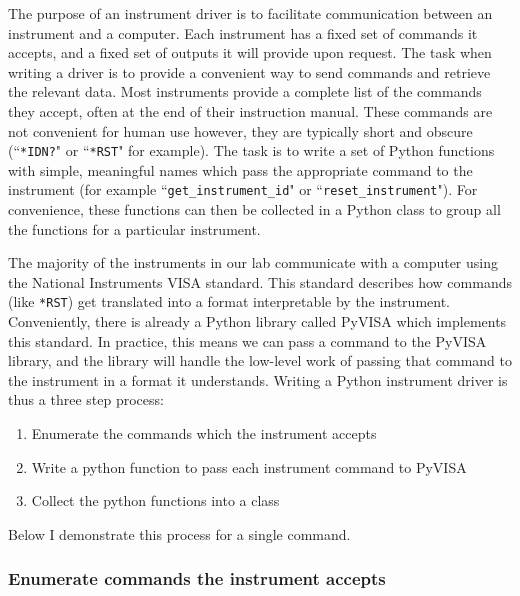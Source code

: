 \documentclass[edeposit,fullpage,draftthesis]{uiucthesis2009}
\newcommand{\code}[1]{\texttt{#1}}
\begin{document}
\begin{appendices}
    The purpose of an instrument driver is to facilitate communication between an instrument and a
    computer. Each instrument has a fixed set of commands it accepts, and a fixed set of outputs it will
    provide upon request. The task when writing a driver is to provide a convenient way to send commands
    and retrieve the relevant data.
    Most instruments provide a complete list of the commands they accept, often at the end of their instruction manual.
    These commands are not convenient for human use however, they are typically short and obscure 
    (``\code{*IDN?}" or ``\code{*RST}" for example).
    The task is to write a set of Python functions with simple, meaningful names which pass the
    appropriate command to the instrument (for example ``\code{get\_instrument\_id}" or ``\code{reset\_instrument}"). 
    For convenience, these functions can then be collected in a
    Python class to group all the functions for a particular instrument.
    
    The majority of the instruments in our lab communicate with a computer using the National Instruments VISA
    standard. This standard describes how commands (like \code{*RST}) get translated into a format interpretable by the instrument.
    Conveniently, there is already a Python library called PyVISA which implements this standard.
    In practice, this means we can pass a command to the PyVISA library, and the library will handle the low-level
    work of passing that command to the instrument in a format it understands.
    Writing a Python instrument driver is thus a three step process:
    \begin{enumerate}
        \item Enumerate the commands which the instrument accepts
        \item Write a python function to pass each instrument command to PyVISA
        \item Collect the python functions into a class
    \end{enumerate}
    Below I demonstrate this process for a single command.
    
    \subsubsection*{Enumerate commands the instrument accepts}
    

\end{appendices}
\end{document}
